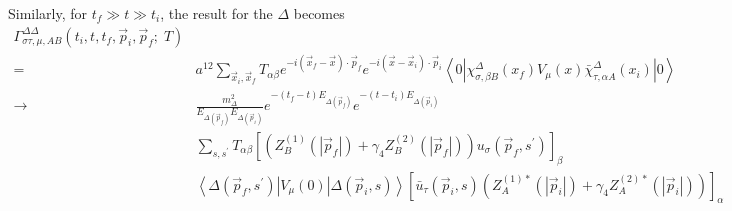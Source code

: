 \documentclass[12pt]{article}
\begin{document}
%
Similarly, for $t_f\gg t\gg t_i$, the result for the $\Delta$ becomes
\begin{equation}
\begin{split}
\Gamma^{\Delta\Delta}_{\sigma\tau,\mu,AB}(t_i,t,t_f,\vec{p}_i,\vec{p}_f;\;T) &\\
  =\ & a^{12}\sum_{\vec{x}_i,\vec{x}_f} T_{\alpha\beta} 
     e^{-i(\vec{x}_f-\vec{x})\cdot\vec{p}_f}
     e^{-i(\vec{x}-\vec{x}_i)\cdot\vec{p}_i}
     \left<0\left|\chi^\Delta_{\sigma,\beta B}(x_f)V_\mu(x)\bar\chi^\Delta_{\tau,\alpha A}(x_i)
     \right|0\right> \\
\to& \frac{m_\Delta^2}{E_{\Delta(\vec{p}_f)}E_{\Delta(\vec{p}_i)}}
     e^{-(t_f-t)E_{\Delta(\vec{p}_f)}}e^{-(t-t_i)E_{\Delta(\vec{p}_i)}} \\
  &  \sum_{s,s^\prime}  T_{\alpha\beta} 
     \left[\left(Z_B^{(1)}(|\vec{p}_f|)+\gamma_4Z_B^{(2)}(|\vec{p}_f|)\right)
     u_\sigma(\vec{p}_f,s^\prime)\right]_\beta \\
  &  \left<\Delta(\vec{p}_f,s^\prime)\left|V_\mu(0)\right|\Delta(\vec{p}_i,s)\right>
     \left[\bar{u}_\tau(\vec{p}_i,s)
     \left(Z_A^{(1)*}(|\vec{p}_i|)+\gamma_4Z_A^{(2)*}(|\vec{p}_i|)\right)
     \right]_\alpha \\
\end{split}
\label{delta3point}
\end{equation}
\end{document}
